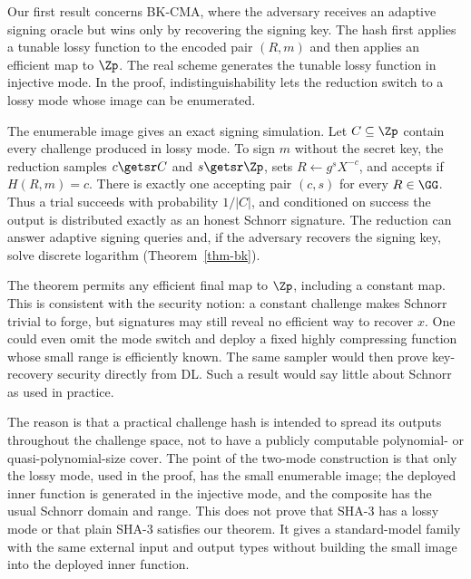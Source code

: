  Our first result concerns BK-CMA, where the adversary receives an adaptive signing oracle but wins only by recovering the signing key. The hash first applies a tunable lossy function to the encoded pair $(R,m)$ and then applies an efficient map to $\Zp$. The real scheme generates the tunable lossy function in injective mode. In the proof, indistinguishability lets the reduction switch to a lossy mode whose image can be enumerated.

The enumerable image gives an exact signing simulation. Let $C\subseteq\Zp$ contain every challenge produced in lossy mode. To sign $m$ without the secret key, the reduction samples $c\getsr C$ and $s\getsr\Zp$, sets $R\gets g^sX^{-c}$, and accepts if $H(R,m)=c$. There is exactly one accepting pair $(c,s)$ for every $R\in\GG$. Thus a trial succeeds with probability $1/|C|$, and conditioned on success the output is distributed exactly as an honest Schnorr signature. The reduction can answer adaptive signing queries and, if the adversary recovers the signing key, solve discrete logarithm (Theorem~\ref{thm-bk}).

The theorem permits any efficient final map to $\Zp$, including a constant map. This is consistent with the security notion: a constant challenge makes Schnorr trivial to forge, but signatures may still reveal no efficient way to recover $x$. One could even omit the mode switch and deploy a fixed highly compressing function whose small range is efficiently known. The same sampler would then prove key-recovery security directly from DL. Such a result would say little about Schnorr as used in practice.

The reason is that a practical challenge hash is intended to spread its outputs throughout the challenge space, not to have a publicly computable polynomial- or quasi-polynomial-size cover. The point of the two-mode construction is that only the lossy mode, used in the proof, has the small enumerable image; the deployed inner function is generated in the injective mode, and the composite has the usual Schnorr domain and range. This does not prove that SHA-3 has a lossy mode or that plain SHA-3 satisfies our theorem. It gives a standard-model family with the same external input and output types without building the small image into the deployed inner function.

